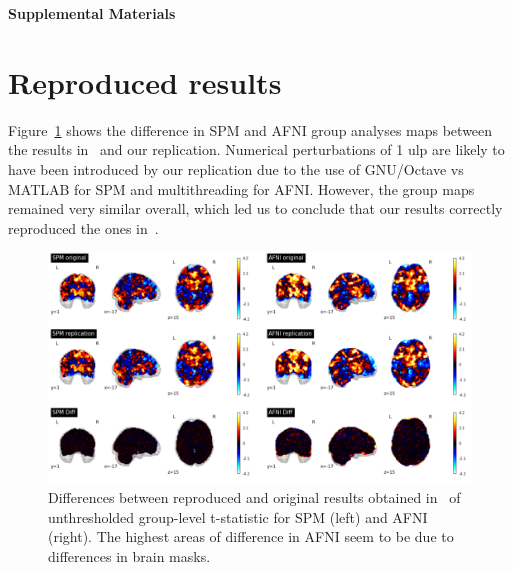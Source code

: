       
  \clearpage

\setcounter{equation}{0}
\setcounter{figure}{0}
\setcounter{table}{0}
\setcounter{section}{0}

\makeatletter
\renewcommand{\theequation}{S\arabic{equation}}
\renewcommand{\thefigure}{S\arabic{figure}}
\renewcommand{\thesection}{S\arabic{section}}

\textbf{\centering \Large Supplemental Materials}

\section{Reproduced results}
\label{sec:supp-repro}

Figure~\ref{fig:replication-diff} shows the difference in SPM and AFNI
group analyses maps between the results in~\cite{bowring2019exploring} and
our replication. Numerical perturbations of 1 ulp are likely to have been
introduced by our replication due to the use of GNU/Octave vs MATLAB for SPM
and multithreading for AFNI.
However, the group maps remained very similar
overall, which led us to conclude that our results correctly reproduced
the ones in~\cite{bowring2019exploring}.
\begin{figure}[ht]
  \includegraphics[width=\textwidth]{chapters/chapter3/figures/replication-diffs.png}
  \caption{Differences between reproduced and original results obtained in~\cite{bowring2019exploring}
    of unthresholded group-level t-statistic for SPM (left) and AFNI
    (right). The highest areas of difference in AFNI seem to be due to
    differences in brain masks.}
  \label{fig:replication-diff}
\end{figure}


